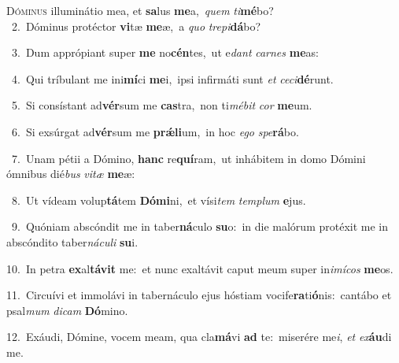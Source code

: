 \lettrine{\initial\textcolor{\initialcolor}{D}}{óminus} illuminátio mea, et \textbf{sa}\-lus \textbf{me}\-a,~\star \textit{quem} \textit{ti}\-\textbf{mé}bo?\\
{\numbfont\textcolor{\numbcolor}{~2.}}~Dóminus protéctor \textbf{vi}\-tæ \textbf{me}\-æ,~\star a \textit{quo} \textit{tre}\-\textit{pi}\textbf{dá}bo?\par
{\numbfont\textcolor{\numbcolor}{~3.}}~Dum apprópiant super \textbf{me} no\-\textbf{cén}\-tes,~\star ut e\textit{dant} \textit{car}\-\textit{nes} \textbf{me}\-as:\par
{\numbfont\textcolor{\numbcolor}{~4.}}~Qui tríbulant me ini\-\textbf{mí}\-ci \textbf{me}\-i,~\star ipsi infirmáti sunt \textit{et} \textit{ce}\-\textit{ci}\textbf{dé}runt.\par
{\numbfont\textcolor{\numbcolor}{~5.}}~Si consístant ad\-\textbf{vér}\-sum me \textbf{cas}\-tra,~\star non ti\-\textit{mé}\-\textit{bit} \textit{cor} \textbf{me}\-um.\par
{\numbfont\textcolor{\numbcolor}{~6.}}~Si exsúrgat ad\-\textbf{vér}\-sum me \textbf{prǽ}\-\textbf{li}um,~\star in hoc \textit{e}\-\textit{go} \textit{spe}\-\textbf{rá}bo.\par
{\numbfont\textcolor{\numbcolor}{~7.}}~Unam pétii a Dómino, \textbf{hanc} re\-\textbf{quí}\-ram,~\star ut inhábitem in domo Dómini ómnibus dié\textit{bus} \textit{vi}\-\textit{tæ} \textbf{me}\-æ:\par
{\numbfont\textcolor{\numbcolor}{~8.}}~Ut vídeam volup\-\textbf{tá}\-tem \textbf{Dó}\-\textbf{mi}ni,~\star et vísi\textit{tem} \textit{tem}\-\textit{plum} \textbf{e}\-jus.\par
{\numbfont\textcolor{\numbcolor}{~9.}}~Quóniam abscóndit me in taber\-\textbf{ná}\-culo \textbf{su}\-o:~\star in die malórum protéxit me in abscóndito taber\-\textit{ná}\-\textit{cu}\textit{li} \textbf{su}\-i.\par
{\numbfont\textcolor{\numbcolor}{10.}}~In petra \textbf{ex}\-al\-\textbf{tá}\-\textbf{vit} me:~\star et nunc exaltávit caput meum super in\-\textit{i}\-\textit{mí}\textit{cos} \textbf{me}\-os.\par
{\numbfont\textcolor{\numbcolor}{11.}}~Circuívi et immolávi in tabernáculo ejus hóstiam vocife\-\textbf{ra}\-ti\-\textbf{ó}\-nis:~\star cantábo et psal\textit{mum} \textit{di}\-\textit{cam} \textbf{Dó}\-mino.\par
{\numbfont\textcolor{\numbcolor}{12.}}~Exáudi, Dómine, vocem meam, qua cla\-\textbf{má}\-vi \textbf{ad} te:~\star miserére me\-\textit{i}\-, \textit{et} \textit{ex}\-\textbf{áu}di me.\par
